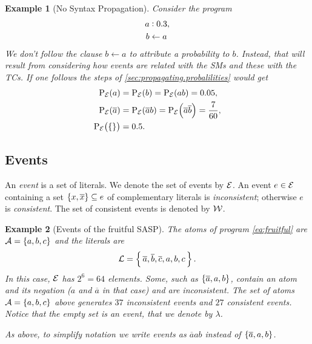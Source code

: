 \documentclass{tlp}
\newtheorem{example}{Example}
\newcommand{\at}[1]{\ensuremath{\!\del{#1}}}        %
\newcommand{\cla}[1]{\ensuremath{{\cal #1}}}        %
\newcommand{\clause}{\ensuremath{\leftarrow}}
\newcommand{\co}[1]{\ensuremath{\overline{#1}}}     %
\newcommand{\ATOMSset}{\ensuremath{\cla{A}}}
\newcommand{\LITERALSset}{\ensuremath{\cla{L}}}
\newcommand{\EVENTSset}{\ensuremath{\cla{E}}}
\newcommand{\CONSISTset}{\ensuremath{\cla{W}}}
\newcommand{\prfunc}{\ensuremath{\mathrm{P}}}
\newcommand{\prd}[1]{\ensuremath{\prfunc_{#1}}}
\newcommand{\prE}{\prd{\EVENTSset}}
\newcommand{\probfact}[2]{\ensuremath{#1:#2}}
\newcommand{\emptyevent}{\ensuremath{\lambda}}
\begin{document}
\begin{example}[No Syntax Propagation]\label{example:not.syntax.propagation}
    Consider the program
    \begin{equation*}
        \begin{split}
            \probfact{a&}{0.3}, \\
            b & \clause a
        \end{split}
    \end{equation*}
    We don't follow the clause \(b \clause a\) to attribute a probability to \(b\). Instead, that will result from considering how events are related with the \aclp{SM} and these with the \aclp{TC}. If one follows the steps of \cref{sec:propagating.probalilities} would get 
    \begin{equation*}
        \begin{split}
            \prE\at{a} & = \prE\at{b} = \prE\at{ab} = 0.05,\\
            \prE\at{\co{a}} & = \prE\at{\co{a} b} = \prE\at{\co{a}\co{b}} = \frac{7}{60},\\
            \prE\at{\set{}} & = 0.5.\\
        \end{split}
    \end{equation*}
\end{example}

\subsection*{Events}

An \emph{event} is a set of literals.
We denote the set of events by \(\EVENTSset\).
An event \(e \in \EVENTSset\) containing a set
   \(\set{x, \co{x}} \subseteq e\)
of complementary literals is \textit{inconsistent};
otherwise \(e\) is \textit{consistent}.
The set of consistent events is denoted by \(\CONSISTset\).

\begin{example}[Events of the fruitful \ac{SASP}]\label{ex:events}\em
  The atoms of program \cref{eq:fruitful} are
  \(\ATOMSset = \set{a, b, c}\) and the literals are
\begin{equation*}
   \LITERALSset = \set{\, \co{a}, \co{b}, \co{c}, a, b, c\, }.
\end{equation*}
In this case, \(\EVENTSset\) has \(2^6 = 64\) elements.  Some, such as
\(\set{\co{a}, a, b}\), contain an atom and its negation (\(a\) and
\(\co{a}\) in that case) and are inconsistent.  The set of atoms
\(\ATOMSset = \set{a, b, c}\) above generates \(37\) inconsistent
events and \(27\) consistent events.  Notice that the empty set is an
event, that we denote by \emptyevent.
    
As above, to simplify notation we write events as \(\co{a}ab\) instead
of \(\set{\co{a}, a, b}\).
\end{example}
\end{document}
